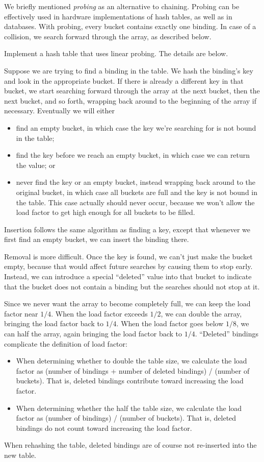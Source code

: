 We briefly mentioned \textit{probing} as an alternative to chaining. Probing can be effectively used in hardware implementations
of hash tables, as well as in databases. With probing, every bucket contains exactly one binding. In case of a collision,
we search forward through the array, as described below.

 Implement a hash table that uses linear probing. The details are below.

 Suppose we are trying to find a binding in the table. We hash the binding's key and look in the appropriate bucket.
If there is already a different key in that bucket, we start searching forward through the array at the next bucket, then the
next bucket, and so forth, wrapping back around to the beginning of the array if necessary. Eventually we will either
\begin{itemize}
  \item find an empty bucket, in which case the key we're searching for is not bound in the table;
  \item find the key before we reach an empty bucket, in which case we can return the value; or
  \item never find the key or an empty bucket, instead wrapping back around to the original bucket, in which case all
        buckets are full and the key is not bound in the table. This case actually should never occur, because we won't allow
        the load factor to get high enough for all buckets to be filled.
\end{itemize}

 Insertion follows the same algorithm as finding a key, except that whenever we first find an empty bucket, we can
insert the binding there.

 Removal is more difficult. Once the key is found, we can't just make the bucket empty, because that would
affect future searches by causing them to stop early. Instead, we can introduce a special ``deleted'' value into that bucket
to indicate that the bucket does not contain a binding but the searches should not stop at it.

 Since we never want the array to become completely full, we can keep the load factor near $1/4$. When the load
factor exceeds $1/2$, we can double the array, bringing the load factor back to $1/4$. When the load factor goes below $1/8$,
we can half the array, again bringing the load factor back to $1/4$. ``Deleted'' bindings complicate the definition of load
factor:
\begin{itemize}
  \item When determining whether to double the table size, we calculate the load factor as (number of bindings + number of deleted
        bindings) / (number of buckets). That is, deleted bindings contribute toward increasing the load factor.
  \item When determining whether the half the table size, we calculate the load factor as (number of bindings) / (number of buckets). That
        is, deleted bindings do not count toward increasing the load factor.
\end{itemize}
When rehashing the table, deleted bindings are of course not re-inserted into the new table.

